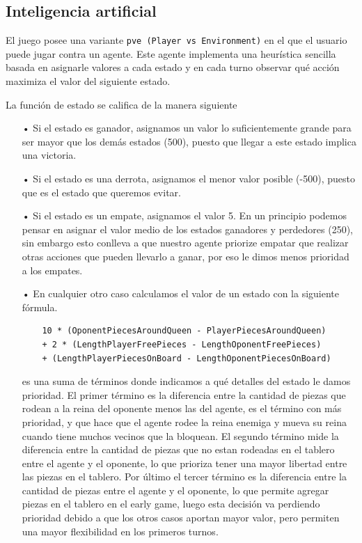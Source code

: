 \documentclass[a4paper,11pt]{article}
\begin{document}
\subsection{Inteligencia artificial}

El juego posee una variante \verb+pve (Player vs Environment)+ en el que el usuario puede jugar contra un agente. Este agente implementa una heur\'istica sencilla basada en asignarle valores a cada estado y en cada turno observar qué acci\'on maximiza el valor del siguiente estado.

La funci\'on de estado se califica de la manera siguiente

\begin{itemize}
\item[•] Si el estado es ganador, asignamos un valor lo suficientemente grande para ser mayor que los dem\'as estados (500), puesto que llegar a este estado implica una victoria.

\item[•] Si el estado es una derrota, asignamos el menor valor posible (-500), puesto que es el estado que queremos evitar.

\item[•] Si el estado es un empate, asignamos el valor 5. En un principio podemos pensar en asignar el valor medio de los estados ganadores y perdedores (250), sin embargo esto conlleva a que nuestro agente priorize empatar que realizar otras acciones que pueden llevarlo a ganar, por eso le dimos menos prioridad a los empates.

\item[•] En cualquier otro caso calculamos el valor de un estado con la siguiente f\'ormula.

\begin{lstlisting}
	10 * (OponentPiecesAroundQueen - PlayerPiecesAroundQueen)
    + 2 * (LengthPlayerFreePieces - LengthOponentFreePieces)
    + (LengthPlayerPiecesOnBoard - LengthOponentPiecesOnBoard)
\end{lstlisting}

es una suma de t\'erminos donde indicamos a qu\'e detalles del estado le damos prioridad. El primer t\'ermino es la diferencia entre la cantidad de piezas que rodean a la reina del oponente menos las del agente, es el t\'ermino con m\'as prioridad, y que hace que el agente rodee la reina enemiga y mueva su reina cuando tiene muchos vecinos que la bloquean. El segundo t\'ermino mide la diferencia entre la cantidad de piezas que no estan rodeadas en el tablero entre el agente y el oponente, lo que prioriza tener una mayor libertad entre las piezas en el tablero. Por \'ultimo el tercer t\'ermino es la diferencia entre la cantidad de piezas entre el agente y el oponente, lo que permite agregar piezas en el tablero en el early game, luego esta decisi\'on va perdiendo prioridad debido a que los otros casos aportan mayor valor, pero permiten una mayor flexibilidad en los primeros turnos.
\end{itemize}
\end{document}
